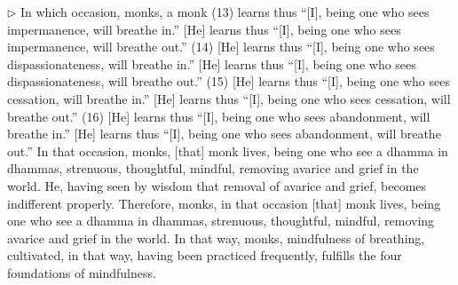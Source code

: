 
\addtocounter{sennum}{-4}
$\triangleright$  In which occasion, monks, a monk (13) learns thus ``[I], being one who sees impermanence, will breathe in.'' [He] learns thus ``[I], being one who sees impermanence, will breathe out.'' (14) [He] learns thus ``[I], being one who sees dispassionateness, will breathe in.'' [He] learns thus ``[I], being one who sees dispassionateness, will breathe out.'' (15) [He] learns thus ``[I], being one who sees cessation, will breathe in.'' [He] learns thus ``[I], being one who sees cessation, will breathe out.'' (16) [He] learns thus ``[I], being one who sees abandonment, will breathe in.'' [He] learns thus ``[I], being one who sees abandonment, will breathe out.''  In that occasion, monks, [that] monk lives, being one who see a dhamma in dhammas, strenuous, thoughtful, mindful, removing avarice and grief in the world.  He, having seen by wisdom that removal of avarice and grief, becomes indifferent properly. Therefore, monks, in that occasion [that] monk lives, being one who see a dhamma in dhammas, strenuous, thoughtful, mindful, removing avarice and grief in the world.  In that way, monks, mindfulness of breathing, cultivated, in that way, having been practiced frequently, fulfills the four foundations of mindfulness.\\

